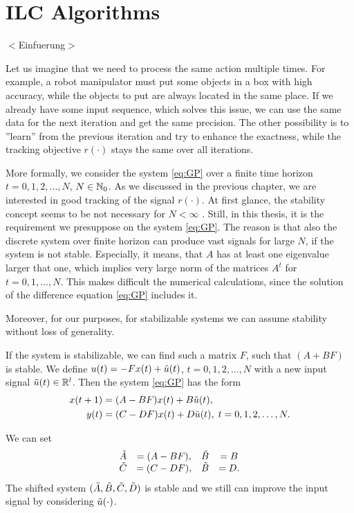 \chapter{ILC Algorithms}
\label{ch:ILCAlg}
{\color{red} $<$Einfuerung$>$}


Let us imagine that we need to process the same action multiple times. 
For example, a robot manipulator must put some objects in a box with high accuracy, while the objects to put are always located in the same place. If we already have some input sequence, which solves this issue, we can use the same data for the next iteration and get the same precision. The other possibility is to ''learn'' from the previous iteration and try to enhance the exactness, while the tracking objective $r(\cdot)$ stays the same over all iterations.

More formally, we consider the system \eqref{eq:GP} over a finite time horizon $t = 0, 1, 2, \dots, N$, $N \in {\mathbb{N}}_0$. As we discussed in the previous chapter, we are interested in good tracking of the signal $r(\cdot)$. At first glance, the stability concept seems to be not necessary for $N < \infty$ . Still, in this thesis, it is the requirement we presuppose on the system \eqref{eq:GP}. The reason is that also the discrete system over finite horizon can produce vast signals for large $N$, if the system is not stable. Especially, it means, that $A$ has at least one eigenvalue larger that one, which implies very large norm of the matrices $A^t$ for $t = 0, 1, \dots, N$. This makes difficult the numerical calculations, since the solution of the difference equation \eqref{eq:GP} includes it. 

Moreover, for our purposes, for stabilizable systems we can assume stability without loss of generality. 

If the system is stabilizable, we can find such a matrix $F$, such that $(A + B F )$ is stable. 
We define $u(t) = - Fx(t) + \tilde{u}(t)$, $t = 0,1,2, \dots, N$ with a new input signal $\tilde{u} (t) \in {\mathbb{R}}^l$. Then the system \eqref{eq:GP} has the form 
\begin{align}
\begin{split}
x(t+1) &= (A - B F)x(t) + B \tilde{u} (t), \\
y(t)   &= (C - D F) x(t) + D\tilde{u}(t), \; t = 0, 1 ,2, \dots, N. 
\end{split}
\end{align}

We can set 
\begin{align}
\begin{array}{c c c c}
\tilde{A} &= (A - B F), &\tilde{B} &= B\\
\tilde{C}  & = (C - D F),&\tilde{B} & = D.
\end{array}
\end{align}
The shifted system $(\tilde{A}, \tilde{B} , \tilde{C}, \tilde{D})$ is stable and we still can improve the input signal by considering $\tilde{u}(\cdot)$.

